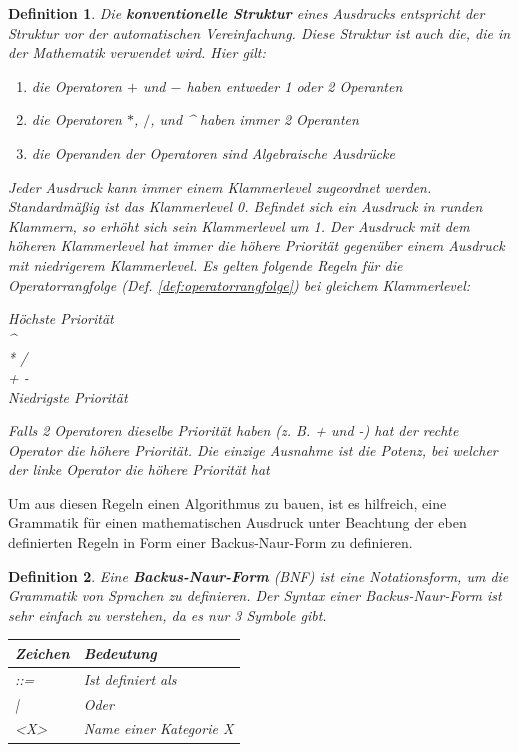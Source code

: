 \documentclass[11pt]{article}
\newtheorem{defin}{Definition}
\newcommand{\lab}[1]{(Def. \ref{#1})}
\begin{document}
\begin{defin}
  \label{def:konventionelle_struktur}
  Die \textbf{konventionelle Struktur} eines Ausdrucks entspricht der Struktur vor der automatischen Vereinfachung. 
  Diese Struktur ist auch die, die in der Mathematik verwendet wird. Hier gilt:

  \begin{enumerate}
    \item die Operatoren $+$ und $-$ haben entweder 1 oder 2 Operanten
    \item die Operatoren $*$, $/$, und \textrm{\textasciicircum} haben immer 2 Operanten
    \item die Operanden der Operatoren  sind Algebraische Ausdrücke
  \end{enumerate}

  Jeder Ausdruck kann immer einem Klammerlevel zugeordnet werden. 
  Standardmäßig ist das Klammerlevel 0. Befindet sich ein Ausdruck in runden Klammern, 
  so erhöht sich sein Klammerlevel um 1. Der Ausdruck mit dem höheren Klammerlevel hat immer die höhere Priorität 
  gegenüber einem Ausdruck mit niedrigerem Klammerlevel.
  Es gelten folgende Regeln für die Operatorrangfolge \lab{def:operatorrangfolge} bei gleichem Klammerlevel:

  \begin{center}
    Höchste Priorität \\
    \textrm{\textasciicircum} \\
    \textrm{* /} \\
    \textrm{+ -} \\
    Niedrigste Priorität
  \end{center}

  Falls 2 Operatoren dieselbe Priorität haben (z. B. + und -) hat 
  der rechte Operator die höhere Priorität.
  Die einzige Ausnahme ist die Potenz, bei welcher der linke Operator
  die höhere Priorität hat

\end{defin}

Um aus diesen Regeln einen Algorithmus zu bauen, ist es hilfreich, 
eine Grammatik für einen mathematischen Ausdruck unter Beachtung der eben definierten Regeln 
in Form einer Backus-Naur-Form zu definieren. 

\begin{defin}
  Eine \textbf{Backus-Naur-Form} (BNF) ist eine Notationsform, um die Grammatik von Sprachen zu definieren. 
  Der Syntax einer Backus-Naur-Form ist sehr einfach zu verstehen, da es nur 3 Symbole gibt.  

  \begin{table}[h]
  \begin{tabular}{|l|l|}
  \hline
    Zeichen     & Bedeutung               \\ \hline
    ::=         & Ist definiert als       \\ \hline
    |           & Oder                    \\ \hline
    <X>         & Name einer Kategorie X  \\ \hline
  \end{tabular}
  \end{table}
\end{defin}
\end{document}
